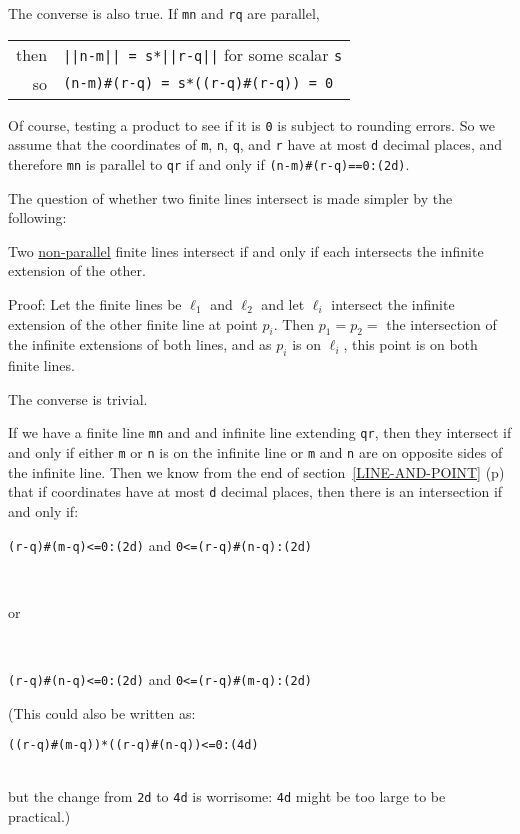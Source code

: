\documentclass[12pt]{article}
\begin{document}
The converse is also true.  If {\tt mn} and {\tt rq} are parallel, \\
\hspace*{0.3in}\begin{tabular}{r@{~~}l}
then    & {\tt ||n-m|| = s*||r-q||} for some scalar {\tt s} \\
so      & \tt (n-m)\#(r-q) = s*((r-q)\#(r-q)) = 0 \\
        \end{tabular}

Of course, testing a product to see if it is {\tt 0} is subject to
rounding errors.  So we assume that the coordinates of {\tt m},
{\tt n}, {\tt q}, and {\tt r} have at most {\tt d} decimal places,
and therefore {\tt mn} is parallel to {\tt qr} if and only if
{\tt (n-m)\#(r-q)==0:(2d)}.

The question of whether two finite lines intersect is made
simpler by the following:
\begin{lemma}
Two \underline{non-parallel} finite lines intersect
if and only if each intersects the infinite extension of the other.
\end{lemma}
\begin{indpar}{0.3in}
Proof: Let the finite lines be $\ell_1$ and $\ell_2$ and let
$\ell_i$ intersect the infinite extension of the other finite line
at point $p_i$.  Then $p_1=p_2=$ the intersection of the infinite
extensions of both lines, and as $p_i$ is on $\ell_i$, this point is
on both finite lines.

The converse is trivial.
\end{indpar}

If we have a finite line {\tt mn} and and infinite line extending
{\tt qr}, then they intersect if and only if either {\tt m} or {\tt n}
is on the infinite line or {\tt m} and {\tt n} are on opposite sides
of the infinite line.  Then we know from the end of
section~\ref{LINE-AND-POINT} (p\pageref{LINE-AND-POINT}) that
if coordinates have at most {\tt d} decimal places, then
there is an intersection if and only if:\\
\centerline{{\tt (r-q)\#(m-q)<=0:(2d)} and {\tt 0<=(r-q)\#(n-q):(2d)}} \\
\centerline{or} \\
\centerline{{\tt (r-q)\#(n-q)<=0:(2d)} and {\tt 0<=(r-q)\#(m-q):(2d)}}

(This could also be written as: \\
\centerline{{\tt ((r-q)\#(m-q))*((r-q)\#(n-q))<=0:(4d)}} \\
but the change from {\tt 2d} to {\tt 4d} is worrisome: {\tt 4d} might
be too large to be practical.)
\end{document}
